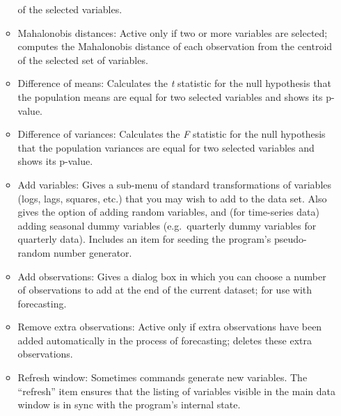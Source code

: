 \begin{itemize}
\begin{itemize}
    of the selected variables.
  \item \textsf{Mahalonobis distances}: Active only if two or more
    variables are selected; computes the Mahalonobis distance of each
    observation from the centroid of the selected set of variables.
  \item \textsf{Difference of means}: Calculates the \emph{t}
    statistic for the null hypothesis that the population means are
    equal for two selected variables and shows its p-value.
  \item \textsf{Difference of variances}: Calculates the \emph{F}
    statistic for the null hypothesis that the population variances
    are equal for two selected variables and shows its p-value.
  \item \textsf{Add variables}: Gives a sub-menu of standard
    transformations of variables (logs, lags, squares, etc.) that you
    may wish to add to the data set. Also gives the option of adding
    random variables, and (for time-series data) adding seasonal dummy
    variables (e.g.\ quarterly dummy variables for quarterly data).
    Includes an item for seeding the program's pseudo-random number
    generator.
  \item \textsf{Add observations}: Gives a dialog box in which you can
    choose a number of observations to add at the end of the current
    dataset; for use with forecasting.
  \item \textsf{Remove extra observations}: Active only if extra
    observations have been added automatically in the process of
    forecasting; deletes these extra observations.
  \item \textsf{Refresh window}: Sometimes  commands
    generate new variables.  The ``refresh'' item ensures that the
    listing of variables visible in the main data window is in sync
    with the program's internal state.
  \end{itemize}


\end{itemize}
